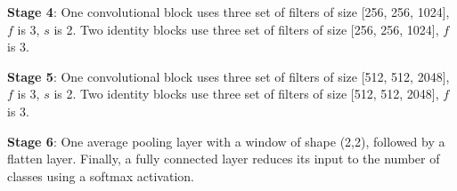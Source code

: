 \textbf{Stage 4}:
One convolutional block uses three set of filters of size [256, 256, 1024], $f$ is 3, $s$ is 2.
Two identity blocks use three set of filters of size [256, 256, 1024], $f$ is 3.

\textbf{Stage 5}:
One convolutional block uses three set of filters of size  [512, 512, 2048], $f$ is 3, $s$ is 2.
Two identity blocks use three set of filters of size  [512, 512, 2048], $f$ is 3.

\textbf{Stage 6}:
One average pooling layer with a window of shape (2,2), followed by a flatten layer. Finally, a fully connected layer reduces its input to the number of classes using a softmax activation.
